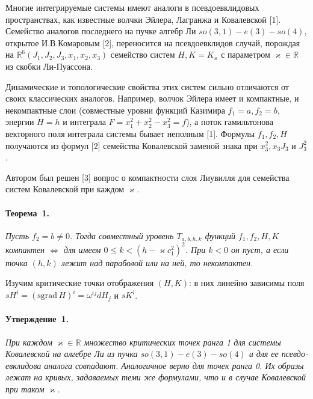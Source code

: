 
\vzmscaption

Многие интегрируемые системы имеют аналоги в псевдоевклидовых пространствах, как известные волчки Эйлера, Лагранжа и Ковалевской [1]. Семейство аналогов последнего на пучке алгебр Ли $so(3,1)-e(3)-so(4)$, открытое И.В.Комаровым [2], переносится на псевдоевклидов случай, порождая на $\mathbb{R}^6(J_1, J_2, J_3, x_1, x_2, x_3)$ семейство систем $H, K = K_{\varkappa}$ с параметром $\varkappa \in \mathbb{R}$ из  скобки Ли-Пуассона.

Динамические и топологические свойства этих систем сильно отличаются от своих классических аналогов. Например, волчок Эйлера имеет и компактные, и некомпактные слои (совместные уровни функций Казимира $f_1 =a, f_2=b$, энергии $H=h$ и интеграла $F = x_1^2 + x_2^2 - x_3^2 =f$), а поток гамильтонова векторного поля интеграла системы бывает неполным [1]. Формулы $f_1, f_2, H$ получаются из формул [2] семейства Ковалевской заменой знака при $x_3^2, x_3 J_3$ и $J_3^2$.

Автором был решен [3] вопрос о компактности слоя Лиувилля для семейства систем Ковалевской при каждом $\varkappa$.
\paragraph{Теорема~1.}
{\it
	Пусть $f_2 = b \ne 0$. Тогда совместный уровень $T_{a, b, h, k}$ функций $f_1, f_2, H, K$ компактен $\Leftrightarrow$ для имеем $0 \le k < (h -\varkappa c_1^2)^2$. При $k <0$ он пуст, а если точка $(h, k)$ лежит над параболой или на ней, то некомпактен.
}

Изучим критические точки отображения $(H, K)$: в них линейно зависимы поля $sH^i = (\mathrm{sgrad}\,H)^i = \omega^{ij} dH_j$ и $sK^i$.

\paragraph{Утверждение~1.}
{\it
	При каждом $\varkappa \in \mathbb{R}$ множество критических точек ранга 1 для системы Ковалевской на алгебре Ли из пучка $so(3,1)-e(3)-so(4)$ и для ее псевдо-евклидова аналога совпадают. Аналогичное верно для точек ранга 0. Их образы лежат на кривых, задаваемых теми же формулами, что и в случае Ковалевской при таком $\varkappa$.
}

